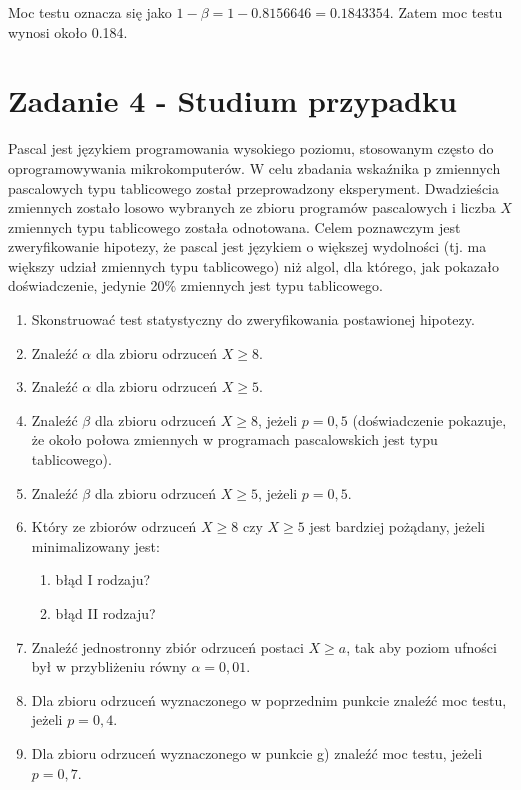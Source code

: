 \documentclass{article}
\begin{document}
Moc testu oznacza się jako $1 - \beta = 1 - 0.8156646 = 0.1843354$. Zatem moc testu wynosi około 0.184.


\newpage
\section{Zadanie 4 - Studium przypadku}
Pascal jest językiem programowania wysokiego poziomu, stosowanym często do oprogramowywania mikrokomputerów. W celu zbadania wskaźnika p zmiennych pascalowych typu tablicowego został przeprowadzony eksperyment. Dwadzieścia zmiennych zostało losowo wybranych ze zbioru programów pascalowych i liczba $X$ zmiennych typu tablicowego została odnotowana. Celem poznawczym jest zweryfikowanie hipotezy, że pascal jest językiem o większej wydolności (tj. ma większy udział zmiennych typu tablicowego) niż algol, dla którego, jak pokazało doświadczenie, jedynie 20\% zmiennych jest typu tablicowego.
\begin{enumerate}[label = \alph*)]
\item Skonstruować test statystyczny do zweryfikowania postawionej hipotezy.
\item Znaleźć $\alpha$ dla zbioru odrzuceń $X\geq8$.
\item Znaleźć $\alpha$ dla zbioru odrzuceń $X\geq5$.
\item Znaleźć $\beta$ dla zbioru odrzuceń $X\geq8$, jeżeli $p=0,5$ (doświadczenie pokazuje, że około połowa zmiennych w programach pascalowskich jest typu tablicowego).
\item Znaleźć $\beta$ dla zbioru odrzuceń $X\geq5$, jeżeli $p=0,5$.
\item Który ze zbiorów odrzuceń $X\geq8$ czy $X\geq5$ jest bardziej pożądany, jeżeli minimalizowany jest:
	\begin{enumerate}[label = \Alph*)]
	\item błąd I rodzaju?
	\item błąd II rodzaju?
	\end{enumerate}
\item Znaleźć jednostronny zbiór odrzuceń postaci $X\geq a$, tak aby poziom ufności był w przybliżeniu równy $\alpha=0,01$.
\item Dla zbioru odrzuceń wyznaczonego w poprzednim punkcie znaleźć moc testu, jeżeli $p=0,4$.
\item Dla zbioru odrzuceń wyznaczonego w punkcie g) znaleźć moc testu, jeżeli $p=0,7$.
\end{enumerate}
\end{document}

